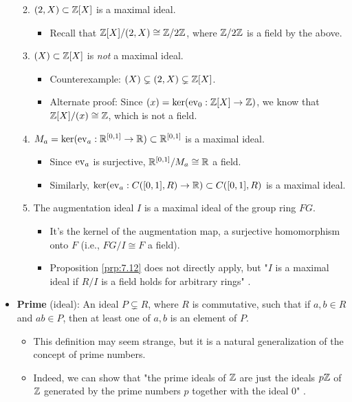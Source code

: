 \documentclass[../notes.tex]{subfiles}
\begin{document}
\begin{itemize}
\begin{enumerate}
\begin{itemize}
        \end{itemize}
        \item $(2,X)\subset\mathbb{Z}[X]$ is a maximal ideal.
        \begin{itemize}
            \item Recall that $\mathbb{Z}[X]/(2,X)\cong\mathbb{Z}/2\mathbb{Z}$, where $\mathbb{Z}/2\mathbb{Z}$ is a field by the above.
        \end{itemize}
        \item $(X)\subset\mathbb{Z}[X]$ is \emph{not} a maximal ideal.
        \begin{itemize}
            \item Counterexample: $(X)\subsetneq(2,X)\subsetneq\mathbb{Z}[X]$.
            \item Alternate proof: Since $(x)=\ker(\operatorname{ev}_0:\mathbb{Z}[X]\to\mathbb{Z})$, we know that $\mathbb{Z}[X]/(x)\cong\mathbb{Z}$, which is not a field.
        \end{itemize}
        \item $M_a=\ker(\operatorname{ev}_a:\mathbb{R}^{[0,1]}\to\mathbb{R})\subset\mathbb{R}^{[0,1]}$ is a maximal ideal.
        \begin{itemize}
            \item Since $\operatorname{ev}_a$ is surjective, $\mathbb{R}^{[0,1]}/M_a\cong\mathbb{R}$ a field.
            \item Similarly, $\ker(\operatorname{ev}_a:C([0,1],R)\to\mathbb{R})\subset C([0,1],R)$ is a maximal ideal.
        \end{itemize}
        \item The augmentation ideal $I$ is a maximal ideal of the group ring $FG$.
        \begin{itemize}
            \item It's the kernel of the augmentation map, a surjective homomorphism onto $F$ (i.e., $FG/I\cong F$ a field).
            \item Proposition \ref{prp:7.12} does not directly apply, but "$I$ is a maximal ideal if $R/I$ is a field holds for arbitrary rings" \parencite[255]{bib:DummitFoote}.
        \end{itemize}
    \end{enumerate}
    \item \textbf{Prime} (ideal): An ideal $P\subsetneq R$, where $R$ is commutative, such that if $a,b\in R$ and $ab\in P$, then at least one of $a,b$ is an element of $P$.
    \begin{itemize}
        \item This definition may seem strange, but it is a natural generalization of the concept of prime numbers.
        \item Indeed, we can show that "the prime ideals of $\mathbb{Z}$ are just the ideals $p\mathbb{Z}$ of $\mathbb{Z}$ generated by the prime numbers $p$ together with the ideal 0" \parencite[255]{bib:DummitFoote}.

\end{itemize}
\end{itemize}
\end{document}
